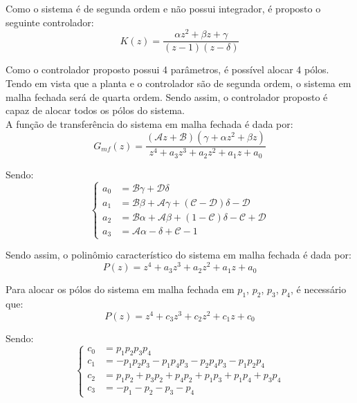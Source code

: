 \documentclass[]{politex}
\begin{document}
Como o sistema é de segunda ordem e não possui integrador, é proposto o seguinte controlador:
\begin{equation}
K(z) = \frac{\alpha z^2 + \beta z + \gamma}{(z-1)(z-\delta)}
\end{equation}

Como o controlador proposto possui 4 parâmetros, é possível alocar 4 pólos. Tendo em vista que a planta e o controlador são de segunda ordem, o sistema em malha fechada será de quarta ordem. Sendo assim, o controlador proposto é capaz de alocar todos os pólos do sistema. \\

A função de transferência do sistema em malha fechada é dada por:
\begin{equation}
G_{mf}(z) = \frac{(\mathcal{A} z+\mathcal{B}) \left(\gamma +\alpha  z^2+\beta  z\right)}{z^4 + a_3 z^3 + a_2 z^2 + a_1 z + a_0}
\end{equation}

Sendo:
\begin{equation}
\begin{cases}
a_0 &=  \mathcal{B} \gamma  + \mathcal{D} \delta\\
a_1 &= \mathcal{B} \beta + \mathcal{A} \gamma +(\mathcal{C}  -  \mathcal{D}) \delta -\mathcal{D}   \\
a_2 &= \mathcal{B} \alpha + \mathcal{A} \beta + (1 -\mathcal{C}) \delta -\mathcal{C} +\mathcal{D}  \\
a_3 &=   \mathcal{A} \alpha -\delta +\mathcal{C} -1
\end{cases}
\end{equation}



Sendo assim, o polinômio característico do sistema em malha fechada é dada por:
\begin{equation}
P(z) = z^4 + a_3 z^3 + a_2 z^2 + a_1 z + a_0
\end{equation}

Para alocar os pólos do sistema em malha fechada em $p_1$, $p_2$, $p_3$, $p_4$, é necessário que:
\begin{equation}
P(z) = z^4 + c_3 z^3 + c_2 z^2 + c_1 z + c_0
\end{equation}

Sendo:
\begin{equation}
\begin{cases}
c_0 &= p_1 p_2 p_3 p_4 \\
c_1 &= -p_1 p_2 p_3-p_1 p_4 p_3-p_2 p_4 p_3-p_1 p_2 p_4 \\
c_2 &= p_1 p_2+p_3 p_2+p_4 p_2+p_1 p_3+p_1 p_4+p_3 p_4 \\
c_3 &= -p_1-p_2-p_3-p_4
\end{cases}
\end{equation}
\end{document}
